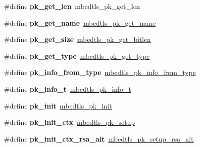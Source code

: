 \begin{DoxyCompactItemize}
\#define {\bfseries pk\+\_\+get\+\_\+len}~mbedtls\+\_\+pk\+\_\+get\+\_\+len
\item 
\mbox{\label{compat-1_83_8h_a5f9942ed021e7c2c0d45757fce7d3dc0}} 
\#define {\bfseries pk\+\_\+get\+\_\+name}~\mbox{\hyperlink{pk_8h_a1b0fb8d16905ec72515dd574b77a4518}{mbedtls\+\_\+pk\+\_\+get\+\_\+name}}
\item 
\mbox{\label{compat-1_83_8h_aab133dff315d7e015f5b840aa66b144f}} 
\#define {\bfseries pk\+\_\+get\+\_\+size}~\mbox{\hyperlink{pk_8h_a4a31083a590b155dd54d22cf618eefcc}{mbedtls\+\_\+pk\+\_\+get\+\_\+bitlen}}
\item 
\mbox{\label{compat-1_83_8h_acf247de4cccefdb1eee599aa773c835e}} 
\#define {\bfseries pk\+\_\+get\+\_\+type}~\mbox{\hyperlink{pk_8h_ab568e6594c1c4cffaa5046e1e0cada55}{mbedtls\+\_\+pk\+\_\+get\+\_\+type}}
\item 
\mbox{\label{compat-1_83_8h_ad13dc6ba5c9ed9ae8d6e0c5247dbe021}} 
\#define {\bfseries pk\+\_\+info\+\_\+from\+\_\+type}~\mbox{\hyperlink{pk_8h_a05eb3e96499280b250cb71e2ef2d270b}{mbedtls\+\_\+pk\+\_\+info\+\_\+from\+\_\+type}}
\item 
\mbox{\label{compat-1_83_8h_a688e67610e818e68bfe4390a99cab6b5}} 
\#define {\bfseries pk\+\_\+info\+\_\+t}~\mbox{\hyperlink{structmbedtls__pk__info__t}{mbedtls\+\_\+pk\+\_\+info\+\_\+t}}
\item 
\mbox{\label{compat-1_83_8h_ae60c8908b3cf09416f8b2449e10999e1}} 
\#define {\bfseries pk\+\_\+init}~\mbox{\hyperlink{pk_8h_a999d1160bb30c03d0c4382c3a9b0aa89}{mbedtls\+\_\+pk\+\_\+init}}
\item 
\mbox{\label{compat-1_83_8h_af85f763fa88c3d85a6d9eba78ebbceb3}} 
\#define {\bfseries pk\+\_\+init\+\_\+ctx}~\mbox{\hyperlink{pk_8h_a7d6cc2c1768cc6db883b08c3c0f10889}{mbedtls\+\_\+pk\+\_\+setup}}
\item 
\mbox{\label{compat-1_83_8h_a3f2273b7023738d0fa10b169f5375c31}} 
\#define {\bfseries pk\+\_\+init\+\_\+ctx\+\_\+rsa\+\_\+alt}~\mbox{\hyperlink{pk_8h_ab719d0b89ef0a49fef2bc8ba20e4726b}{mbedtls\+\_\+pk\+\_\+setup\+\_\+rsa\+\_\+alt}}
\item 

\end{DoxyCompactItemize}
